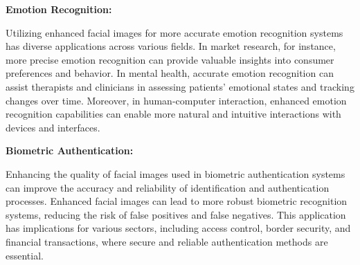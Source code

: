 \textbf{Emotion Recognition:}

    Utilizing enhanced facial images for more accurate emotion recognition systems has diverse applications across various fields.
    In market research, for instance, more precise emotion recognition can provide valuable insights into consumer preferences and behavior.
    In mental health, accurate emotion recognition can assist therapists and clinicians in assessing patients' emotional states and tracking changes over time.
    Moreover, in human-computer interaction, enhanced emotion recognition capabilities can enable more natural and intuitive interactions with devices and interfaces.

\textbf{Biometric Authentication:}

    Enhancing the quality of facial images used in biometric authentication systems can improve the accuracy and reliability of identification and authentication processes.
    Enhanced facial images can lead to more robust biometric recognition systems, reducing the risk of false positives and false negatives.
    This application has implications for various sectors, including access control, border security, and financial transactions, where secure and reliable authentication methods are essential.
